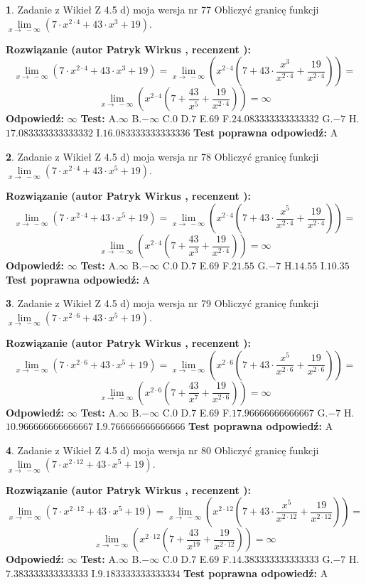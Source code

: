 \documentclass[12pt, a4paper]{article}
\theoremstyle{definition} %
\newtheorem{zad}{}
\newcommand{\zadStart}[1]{\begin{zad}#1\newline}
\newcommand{\zadStop}{\end{zad}}
\newcommand{\rozwStart}[2]{\noindent \textbf{Rozwiązanie (autor #1 , recenzent #2): }\newline}
\newcommand{\rozwStop}{\newline}
\newcommand{\odpStart}{\noindent \textbf{Odpowiedź:}\newline}
\newcommand{\odpStop}{\newline}
\newcommand{\testStart}{\noindent \textbf{Test:}\newline}
\newcommand{\testStop}{\newline}
\newcommand{\kluczStart}{\noindent \textbf{Test poprawna odpowiedź:}\newline}
\newcommand{\kluczStop}{\newline}
\begin{document}
\zadStart{Zadanie z Wikieł Z 4.5 d) moja wersja nr 77}
Obliczyć granicę funkcji  $\lim\limits_{x\to\ -\infty}(7 \cdot x^{2\cdot4}+43 \cdot x^{3}+19)$.
\zadStop
\rozwStart{Patryk Wirkus}{}
$$\lim\limits_{x\to\ -\infty}(7 \cdot x^{2\cdot4}+43 \cdot x^{3}+19) = \lim\limits_{x\to\ -\infty}(x^{2\cdot4}(7 +43 \cdot \frac{x^{3}}{x^{2\cdot4}}+\frac{19}{x^{2\cdot4}})) =$$ $$\lim\limits_{x\to\ -\infty}(x^{2\cdot4}(7 +\frac{43}{x^{5}}+\frac{19}{x^{2\cdot4}})) =\infty$$
\rozwStop
\odpStart
$\infty$
\odpStop
\testStart
A.$\infty$ B.$-\infty$ C.$0$ D.$7$ E.$69$
F.$24.083333333333332$ G.$-7$
H.$17.083333333333332$
I.$16.083333333333336$
\testStop
\kluczStart
A
\kluczStop



\zadStart{Zadanie z Wikieł Z 4.5 d) moja wersja nr 78}
Obliczyć granicę funkcji  $\lim\limits_{x\to\ -\infty}(7 \cdot x^{2\cdot4}+43 \cdot x^{5}+19)$.
\zadStop
\rozwStart{Patryk Wirkus}{}
$$\lim\limits_{x\to\ -\infty}(7 \cdot x^{2\cdot4}+43 \cdot x^{5}+19) = \lim\limits_{x\to\ -\infty}(x^{2\cdot4}(7 +43 \cdot \frac{x^{5}}{x^{2\cdot4}}+\frac{19}{x^{2\cdot4}})) =$$ $$\lim\limits_{x\to\ -\infty}(x^{2\cdot4}(7 +\frac{43}{x^{3}}+\frac{19}{x^{2\cdot4}})) =\infty$$
\rozwStop
\odpStart
$\infty$
\odpStop
\testStart
A.$\infty$ B.$-\infty$ C.$0$ D.$7$ E.$69$
F.$21.55$ G.$-7$
H.$14.55$
I.$10.35$
\testStop
\kluczStart
A
\kluczStop



\zadStart{Zadanie z Wikieł Z 4.5 d) moja wersja nr 79}
Obliczyć granicę funkcji  $\lim\limits_{x\to\ -\infty}(7 \cdot x^{2\cdot6}+43 \cdot x^{5}+19)$.
\zadStop
\rozwStart{Patryk Wirkus}{}
$$\lim\limits_{x\to\ -\infty}(7 \cdot x^{2\cdot6}+43 \cdot x^{5}+19) = \lim\limits_{x\to\ -\infty}(x^{2\cdot6}(7 +43 \cdot \frac{x^{5}}{x^{2\cdot6}}+\frac{19}{x^{2\cdot6}})) =$$ $$\lim\limits_{x\to\ -\infty}(x^{2\cdot6}(7 +\frac{43}{x^{7}}+\frac{19}{x^{2\cdot6}})) =\infty$$
\rozwStop
\odpStart
$\infty$
\odpStop
\testStart
A.$\infty$ B.$-\infty$ C.$0$ D.$7$ E.$69$
F.$17.96666666666667$ G.$-7$
H.$10.966666666666667$
I.$9.766666666666666$
\testStop
\kluczStart
A
\kluczStop



\zadStart{Zadanie z Wikieł Z 4.5 d) moja wersja nr 80}
Obliczyć granicę funkcji  $\lim\limits_{x\to\ -\infty}(7 \cdot x^{2\cdot12}+43 \cdot x^{5}+19)$.
\zadStop
\rozwStart{Patryk Wirkus}{}
$$\lim\limits_{x\to\ -\infty}(7 \cdot x^{2\cdot12}+43 \cdot x^{5}+19) = \lim\limits_{x\to\ -\infty}(x^{2\cdot12}(7 +43 \cdot \frac{x^{5}}{x^{2\cdot12}}+\frac{19}{x^{2\cdot12}})) =$$ $$\lim\limits_{x\to\ -\infty}(x^{2\cdot12}(7 +\frac{43}{x^{19}}+\frac{19}{x^{2\cdot12}})) =\infty$$
\rozwStop
\odpStart
$\infty$
\odpStop
\testStart
A.$\infty$ B.$-\infty$ C.$0$ D.$7$ E.$69$
F.$14.383333333333333$ G.$-7$
H.$7.383333333333333$
I.$9.183333333333334$
\testStop
\kluczStart
A
\kluczStop
\end{document}
